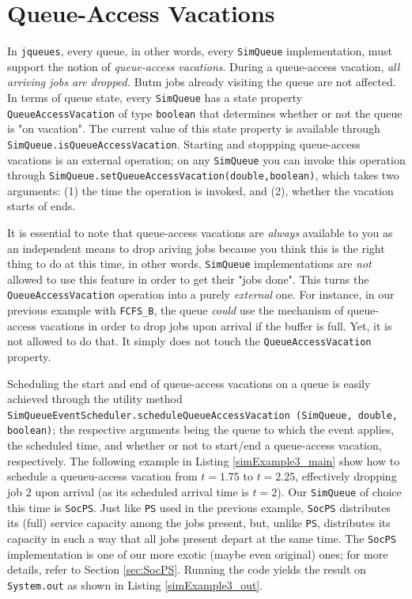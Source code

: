 \section{Queue-Access Vacations}
\label{sec:guided:qav}

In \lstinline|jqueues|, every queue,
  in other words, every \lstinline|SimQueue| implementation,
  must support the notion of {\em queue-access vacations}.
During a queue-access vacation,
  {\em all arriving jobs are dropped.}
Butm jobs already visiting the queue are not affected.
In terms of queue state,
  every \lstinline|SimQueue| has a state
  property \lstinline|QueueAccessVacation|
  of type \lstinline|boolean|
  that determines whether or not the
  queue is "on vacation".
The current value of this state property is available through
  \lstinline{SimQueue.isQueueAccessVacation}.
Starting and stoppping queue-access vacations
  is an external operation;
  on any \lstinline{SimQueue} you can
  invoke this operation
  through \lstinline{SimQueue.setQueueAccessVacation(double,boolean)},
  which takes two arguments: (1) the time the operation is invoked,
  and (2), whether the vacation starts of ends.

It is essential to note that queue-access vacations
  are {\em always\/} available to you
  as an independent means to drop ariving jobs
  because you think this is the right thing to do at this time,
  in other words,
  \lstinline|SimQueue| implementations
  are {\em not\/} allowed to use this feature
  in order to get their "jobs done".
This turns the \lstinline|QueueAccessVacation|
  operation into a purely {\em external\/} one.
For instance,
  in our previous example with \lstinline|FCFS_B|,
  the queue {\em could\/} use the mechanism
  of queue-access vacations in order to
  drop jobs upon arrival if the buffer is full.
Yet, it is not allowed to do that.
It simply does not touch the \lstinline|QueueAccessVacation| property.

Scheduling the start and end of queue-access vacations on a queue
  is easily achieved through the utility method
  \lstinline|SimQueueEventScheduler.scheduleQueueAccessVacation (SimQueue, double, boolean)|;
  the respective arguments being the queue to which the event applies,
  the scheduled time,
  and whether or not to start/end a queue-access vacation,
  respectively.
The following example in Listing \ref{simExample3_main}
  show how to schedule a queueu-access vacation from
  $t=1.75$ to $t=2.25$, effectively dropping job $2$
  upon arrival (as its scheduled arrival time is $t=2$).
Our \lstinline|SimQueue| of choice this time is \lstinline|SocPS|.
Just like \lstinline|PS| used in the previous example,
  \lstinline|SocPS| distributes its (full) service capacity
  among the jobs present,
  but, unlike \lstinline|PS|,
  distributes its capacity in such a way that all
  jobs present depart at the same time.
The \lstinline|SocPS| implementation
  is one of our more exotic (maybe even original) ones;
  for more details,
  refer to Section \ref{sec:SocPS}.
Running the code yields the result on \lstinline|System.out|
  as shown in Listing \ref{simExample3_out}.

